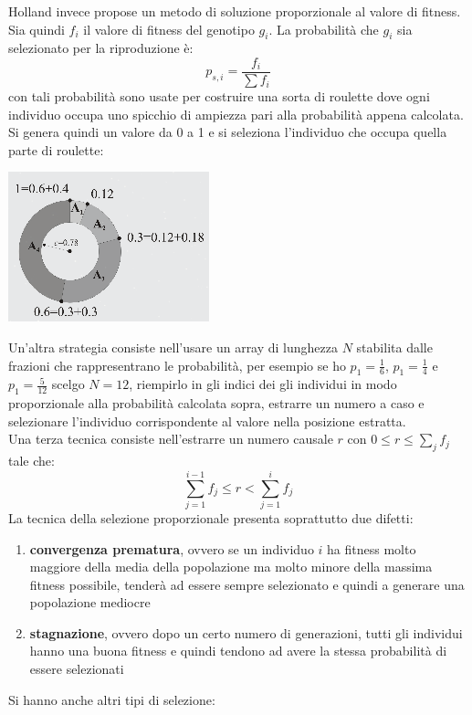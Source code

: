 \documentclass[a4paper,12pt, oneside]{book}
\begin{document}
Holland invece propose un metodo di soluzione proporzionale al
valore di fitness. Sia quindi $f_i$ il valore di fitness del
genotipo $g_i$. La probabilità che $g_i$ sia selezionato per la
riproduzione è:
\[p_{s,i}=\frac{f_i}{\sum f_i}\]
con tali probabilità sono usate per costruire una sorta di roulette
dove ogni individuo occupa uno spicchio di ampiezza pari alla
probabilità appena calcolata.
Si genera quindi un valore da 0 a 1 e
si seleziona l'individuo che occupa quella parte di roulette:
\begin{center}
  \includegraphics[scale = 0.7]{img/bio4.png}
\end{center}
Un'altra strategia consiste nell'usare un array di lunghezza $N$
stabilita dalle frazioni che rappresentrano le probabilità, per
esempio se ho $p_1=\frac{1}{6}$, $p_1=\frac{1}{4}$ e
$p_1=\frac{5}{12}$ scelgo $N=12$,
riempirlo in gli indici dei gli individui in modo proporzionale alla
probabilità calcolata sopra, estrarre un numero a caso e
selezionare l'individuo corrispondente al valore nella posizione
estratta.\\
Una terza tecnica consiste nell'estrarre un numero causale $r$ con
$0\leq r\leq \sum_j f_j$ tale che:
\[\sum_{j=1}^{i-1}f_j\leq r< \sum_{j=1}^{i}f_j\]
La tecnica della selezione proporzionale presenta soprattutto due
difetti:
\begin{enumerate}
  \item \textbf{convergenza prematura}, ovvero se un individuo $i$
  ha fitness molto maggiore della media della popolazione ma molto
  minore della massima fitness possibile, tenderà ad essere sempre
  selezionato e quindi a generare una popolazione mediocre
  \item \textbf{stagnazione}, ovvero dopo un certo numero di
  generazioni, tutti gli individui hanno una buona fitness e quindi
  tendono ad avere la stessa probabilità di essere selezionati 
\end{enumerate}
Si hanno anche altri tipi di selezione:
\end{document}
